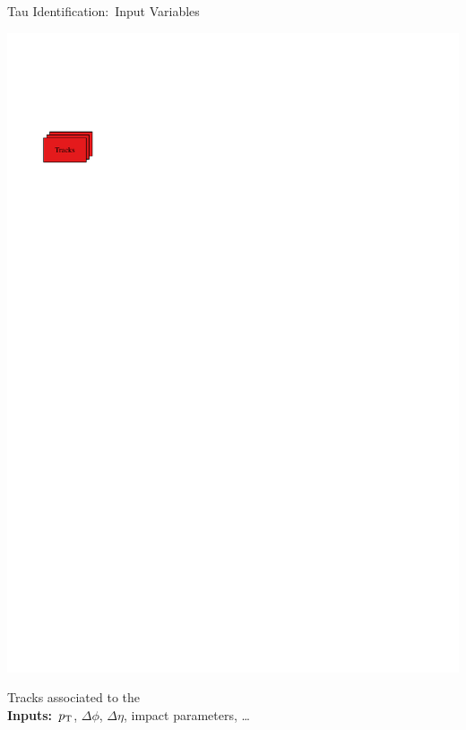 \documentclass[11pt, xcolor={dvipsnames}, aspectratio=169, notes]{beamer}
\begin{document}
\begin{frame}{Tau Identification:\ Input Variables}
\begin{minipage}[c][2.2cm][c]{0.25\textwidth}
    \includegraphics[scale=1]{tauid/track_icon}
  \end{minipage}%
  \begin{minipage}[c][2.2cm][c]{0.75\textwidth}
    Tracks associated to the \tauhadvis\\[0.5\baselineskip]
    \textbf{Inputs:}\ $p_{\text{T}}$, $\Delta \phi$, $\Delta \eta$, impact parameters,
    \dots
  \end{minipage}%


  \begin{minipage}[c][2.2cm][c]{0.25\textwidth}
    \centering


\end{minipage}
\end{frame}
\end{document}
